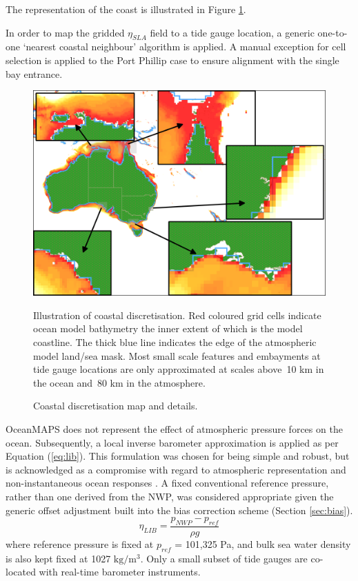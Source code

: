 The representation of the coast is illustrated in Figure \ref{fig:map_masks}.

In order to map the gridded $\eta_{SLA}$ field to a tide gauge location, a generic one-to-one `nearest coastal neighbour' algorithm is applied.
A manual exception for cell selection is applied to the Port Phillip case to ensure alignment with the single bay entrance. 
\begin{figure}[H]
    \centering
    \includegraphics[width=1.0\textwidth]{figures/maps/omaps_masks.png}
    \caption{Coastal discretisation map and details.}
    {Illustration of coastal discretisation.  Red coloured grid cells indicate ocean model bathymetry the inner extent of which is the model coastline.  The thick blue line indicates the edge of the atmospheric model land/sea mask.  Most small scale features and embayments at tide gauge locations are only approximated at scales above~10 km in the ocean and~80 km in the atmosphere. }
    \label{fig:map_masks}
\end{figure}  


OceanMAPS does not represent the effect of atmospheric pressure forces on the ocean.
Subsequently, a local inverse barometer approximation is applied as per Equation (\ref{eq:lib}).
This formulation was chosen for being simple and robust, but is acknowledged as a compromise with regard to atmospheric representation and non-instantaneous ocean responses \citep{Mathers:2004bk}.
A fixed conventional reference pressure, rather than one derived from the NWP, was considered appropriate given the generic offset adjustment built into the bias correction scheme (Section \ref{sec:bias}).  
\begin{equation}
  \eta_{LIB} = \frac{ p_{NWP} - p_{ref} }{ \rho g }
  \label{eq:lib}
\end{equation}
where reference pressure is fixed at $p_{ref}$ = 101,325 Pa, and bulk sea water density is also kept fixed at 1027 $\text{kg}/\text{m}^3$.
Only a small subset of tide gauges are co-located with real-time barometer instruments.


